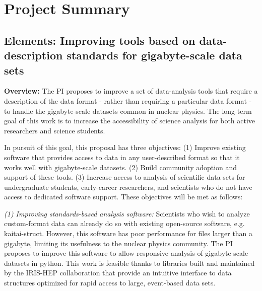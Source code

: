 
\thispagestyle{empty}
\section*{Project Summary}
\subsection*{Elements: Improving tools based on data-description standards for gigabyte-scale data sets}

{\bf Overview:} The PI proposes to improve a set of data-analysis tools that require a description of the data format - rather than requiring a particular data format - to handle the gigabyte-scale datasets common in nuclear physics. The long-term goal of this work is to increase the accessibility of science analysis for both active researchers and science students.  %

In pursuit of this goal, this proposal has three objectives:  
(1) Improve existing software that provides access to data in any user-described format so that it works well with gigabyte-scale datasets.
(2) Build community adoption and support of these tools.
(3) Increase access to analysis of scientific data sets for undergraduate students, early-career researchers, and scientists who do not have access to dedicated software support. 
These objectives will be met as follows:


{\it (1) Improving standards-based analysis software:} Scientists who wish to analyze custom-format data can already do so with existing open-source software, e.g. kaitai-struct.  However, this software has poor performance for files larger than a gigabyte,  limiting its usefulness to the nuclear physics community.  The PI proposes to improve this software to allow responsive analysis of gigabyte-scale datasets in python.  This work is feasible thanks to libraries built and maintained by the IRIS-HEP collaboration that provide an intuitive interface to data structures optimized for rapid access to large, event-based data sets.

